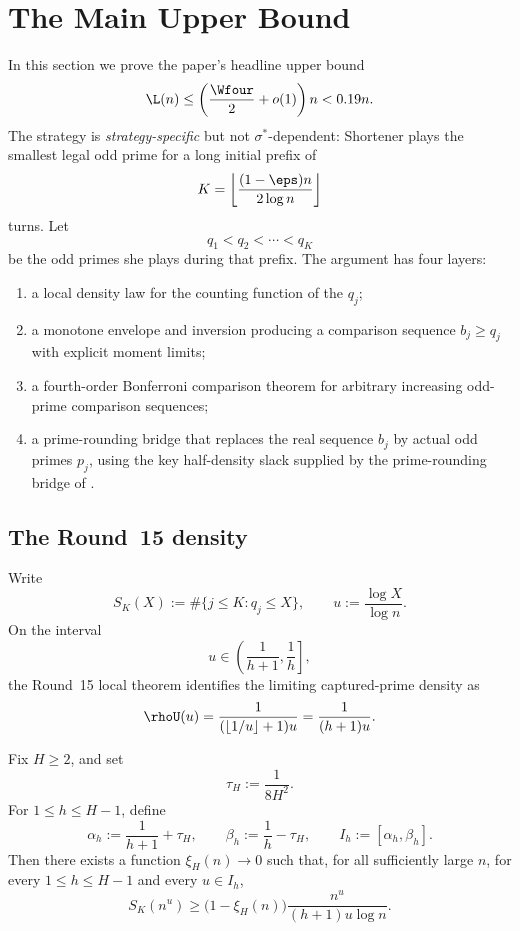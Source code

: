 
\section{The Main Upper Bound}\label{sec:main-upper}

In this section we prove the paper's headline upper bound
\[
  \L(n) \le \left(\frac{\Wfour}{2}+o(1)\right)n < 0.19n.
\]
The strategy is \emph{strategy-specific} but not $\sigma^*$-dependent: Shortener
plays the smallest legal odd prime for a long initial prefix of
\[
  K = \left\lfloor \frac{(1-\eps)n}{2\log n}\right\rfloor
\]
turns.  Let
\[
  q_1 < q_2 < \cdots < q_K
\]
be the odd primes she plays during that prefix.  The argument has four layers:
\begin{enumerate}
  \item a local density law for the counting function of the $q_j$;
  \item a monotone envelope and inversion producing a comparison sequence
    $b_j \ge q_j$ with explicit moment limits;
  \item a fourth-order Bonferroni comparison theorem for arbitrary increasing
    odd-prime comparison sequences;
  \item a prime-rounding bridge that replaces the real sequence $b_j$ by actual
    odd primes $p_j$, using the key half-density slack supplied by the
    prime-rounding bridge of .
\end{enumerate}

\subsection{The Round~15 density}

Write
\[
  S_K(X) := \#\{j\le K : q_j \le X\},
  \qquad
  u := \frac{\log X}{\log n}.
\]
On the interval
\[
  u \in \left(\frac{1}{h+1},\frac1h\right],
\]
the Round~15 local theorem identifies the limiting captured-prime density as
\[
  \rhoU(u) = \frac{1}{(\lfloor 1/u \rfloor+1)u} = \frac{1}{(h+1)u}.
\]

\begin{proposition}\label{prop:local-density}
Fix $H\ge 2$, and set
\[
  \tau_H := \frac{1}{8H^2}.
\]
For $1\le h\le H-1$, define
\[
  \alpha_h := \frac{1}{h+1}+\tau_H,
  \qquad
  \beta_h := \frac1h-\tau_H,
  \qquad
  I_h := [\alpha_h,\beta_h].
\]
Then there exists a function $\xi_H(n)\to 0$ such that, for all sufficiently
large $n$, for every $1\le h\le H-1$ and every $u\in I_h$,
\[
  S_K(n^u)
  \ge
  \bigl(1-\xi_H(n)\bigr)\frac{n^u}{(h+1)u\log n}.
\]
\end{proposition}

